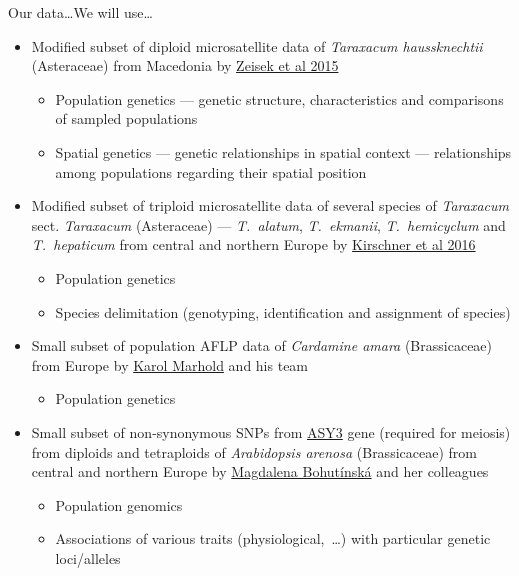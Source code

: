 \documentclass[compress, xelatex, 11pt, xcolor=svgnames, aspectratio=169,
	hyperref={
		bookmarks=true,
		unicode=true,
		colorlinks=true,
		pdftitle={Molecular data in R},
		plainpages=false,
		pdfauthor={Vojtech Zeisek},
		pdfsubject={Course about phylogeny and evolution in R},
		pdfcreator={XeLaTeX},
		pdfkeywords={R, evolution, phylogeny, molecular data},
		linkcolor=Crimson, %
		anchorcolor=Magenta, %
		citecolor=Magenta, %
		filecolor=Magenta, %
		menucolor=Magenta, %
		urlcolor=DodgerBlue, %
		},
	url={hyphens, lowtilde} %
	]{beamer}
\begin{document}
\begin{frame}[allowframebreaks]{Our data\ldots}{We will use\ldots}
		\begin{itemize}
			\item Modified subset of diploid microsatellite data of \textit{Taraxacum haussknechtii} (Asteraceae) from Macedonia by \href{https://trapa.cz/en/taraxacum-section-dioszegia}{Zeisek et al 2015}
			\begin{itemize}
				\item Population genetics --- genetic structure, characteristics and comparisons of sampled populations
				\item Spatial genetics --- genetic relationships in spatial context --- relationships among populations regarding their spatial position
			\end{itemize}
			\item Modified subset of triploid microsatellite data of several species of \textit{Taraxacum} sect. \textit{Taraxacum} (Asteraceae) --- \textit{T.~alatum}, \textit{T.~ekmanii}, \textit{T.~hemicyclum} and \textit{T.~hepaticum} from central and northern Europe by \href{https://trapa.cz/en/identif-oligoclonal-agamospermous-microsp}{Kirschner et al 2016}
			\begin{itemize}
				\item Population genetics
				\item Species delimitation (genotyping, identification and assignment of species)
			\end{itemize}
			\item Small subset of population AFLP data of \textit{Cardamine amara} (Brassicaceae) from Europe by \href{https://web.natur.cuni.cz/botanika/brassiploidy/marholdcv/}{Karol Marhold} and his team
			\begin{itemize}
				\item Population genetics
			\end{itemize}
			\item Small subset of non-synonymous SNPs from \href{https://www.arabidopsis.org/servlets/TairObject?type=locus&name=At2g46980}{ASY3} gene (required for meiosis) from diploids and tetraploids of \textit{Arabidopsis arenosa} (Brassicaceae) from central and northern Europe by \href{https://scholar.google.com/citations?user=kSnTudAAAAAJ}{Magdalena Bohutínská} and her colleagues
			\begin{itemize}
				\item Population genomics
				\item Associations of various traits (physiological,~\ldots) with particular genetic loci/alleles

\end{itemize}
\end{itemize}
\end{frame}
\end{document}
